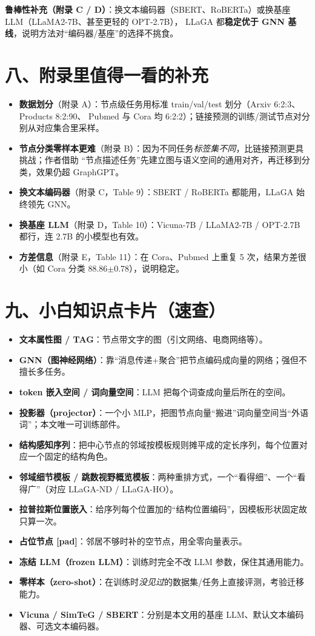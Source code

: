 \documentclass[11pt,UTF8,fontset=fandol]{ctexart}
\begin{document}
\textbf{鲁棒性补充（附录 C / D）}：换文本编码器（SBERT、RoBERTa）或换基座 LLM（LLaMA2-7B、甚至更轻的 OPT-2.7B），
LLaGA 都\textbf{稳定优于 GNN 基线}，说明方法对“编码器/基座”的选择不挑食。

\section{八、附录里值得一看的补充}
\begin{itemize}[leftmargin=2em]
  \item \textbf{数据划分}（附录 A）：节点级任务用标准 train/val/test 划分（Arxiv 6:2:3、Products 8:2:90、
        Pubmed 与 Cora 均 6:2:2）；链接预测的训练/测试节点对分别从对应集合里采样。
  \item \textbf{节点分类零样本更难}（附录 B）：因为不同任务\emph{标签集不同}，比链接预测更具挑战；作者借助
        “节点描述任务”先建立图与语义空间的通用对齐，再迁移到分类，效果仍超 GraphGPT。
  \item \textbf{换文本编码器}（附录 C，Table 9）：SBERT / RoBERTa 都能用，LLaGA 始终领先 GNN。
  \item \textbf{换基座 LLM}（附录 D，Table 10）：Vicuna-7B / LLaMA2-7B / OPT-2.7B 都行，连 2.7B 的小模型也有效。
  \item \textbf{方差信息}（附录 E，Table 11）：在 Cora、Pubmed 上重复 5 次，结果方差很小（如 Cora 分类 88.86$\pm$0.78），说明稳定。
\end{itemize}

\section{九、小白知识点卡片（速查）}
\begin{itemize}[leftmargin=2em]
  \item \textbf{文本属性图 / TAG}：节点带文字的图（引文网络、电商网络等）。
  \item \textbf{GNN（图神经网络）}：靠“消息传递+聚合”把节点编码成向量的网络；强但不擅长多任务。
  \item \textbf{token 嵌入空间 / 词向量空间}：LLM 把每个词查成向量后所在的空间。
  \item \textbf{投影器（projector）}：一个小 MLP，把图节点向量“搬进”词向量空间当“外语词”；本文唯一可训练部件。
  \item \textbf{结构感知序列}：把中心节点的邻域按模板规则摊平成的定长序列，每个位置对应一个固定的结构角色。
  \item \textbf{邻域细节模板 / 跳数视野概览模板}：两种重排方式，一个“看得细”、一个“看得广”（对应 LLaGA-ND / LLaGA-HO）。
  \item \textbf{拉普拉斯位置嵌入}：给序列每个位置加的“结构位置编码”，因模板形状固定故只算一次。
  \item \textbf{占位节点 [pad]}：邻居不够时补的空节点，用全零向量表示。
  \item \textbf{冻结 LLM（frozen LLM）}：训练时完全不改 LLM 参数，保住其通用能力。
  \item \textbf{零样本（zero-shot）}：在训练时\emph{没见过}的数据集/任务上直接评测，考验迁移能力。
  \item \textbf{Vicuna / SimTeG / SBERT}：分别是本文用的基座 LLM、默认文本编码器、可选文本编码器。
\end{itemize}
\end{document}
